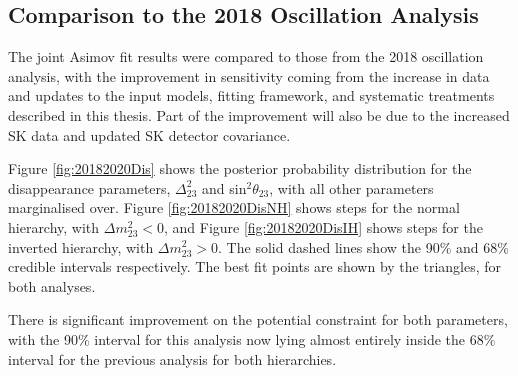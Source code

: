 \subsection{Comparison to the 2018 Oscillation Analysis}

The joint Asimov fit results were compared to those from the 2018 oscillation analysis, with the improvement in sensitivity coming from the increase in data and updates to the input models, fitting framework, and systematic treatments described in this thesis. Part of the improvement will also be due to the increased SK data and updated SK detector covariance.

Figure \ref{fig:20182020Dis} shows the posterior probability distribution for the disappearance parameters, $\Delta^{2}_{23}$ and sin$^{2}\theta_{23}$, with all other parameters marginalised over. Figure \ref{fig:20182020DisNH} shows steps for the normal hierarchy, with $\Delta m^{2}_{23}<0$,  and Figure \ref{fig:20182020DisIH} shows steps for the inverted hierarchy, with $\Delta m^{2}_{23}>0$. The solid dashed lines show the 90$\%$ and 68$\%$ credible intervals respectively. The best fit points are shown by the triangles, for both analyses. 

There is significant improvement on the potential constraint for both parameters, with the 90$\%$ interval for this analysis now lying almost entirely inside the 68$\%$ interval for the previous analysis for both hierarchies.

